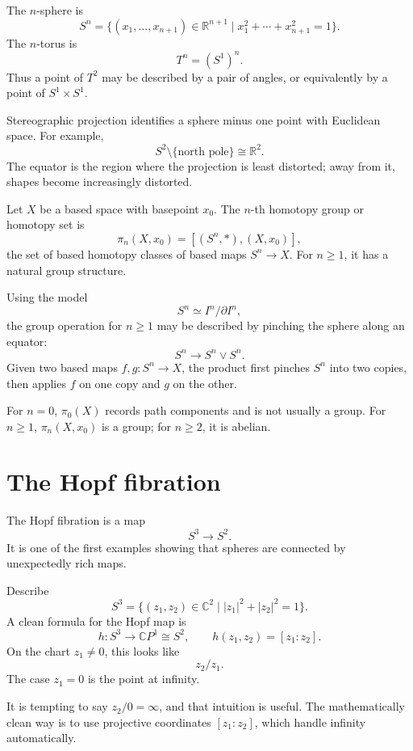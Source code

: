 The \(n\)-sphere is
\[
  S^n=\{(x_1,\dots,x_{n+1})\in\mathbb R^{n+1}\mid x_1^2+\cdots+x_{n+1}^2=1\}.
\]
The \(n\)-torus is
\[
  T^n=(S^1)^n.
\]
Thus a point of \(T^2\) may be described by a pair of angles, or equivalently by a point of \(S^1\times S^1\).

Stereographic projection identifies a sphere minus one point with Euclidean space.  For example,
\[
  S^2\setminus\{\text{north pole}\}\cong\mathbb R^2.
\]
The equator is the region where the projection is least distorted; away from it, shapes become increasingly distorted.

\begin{definition}
Let \(X\) be a based space with basepoint \(x_0\).  The \(n\)-th homotopy group or homotopy set is
\[
  \pi_n(X,x_0)=[(S^n,*),(X,x_0)],
\]
the set of based homotopy classes of based maps \(S^n\to X\).  For \(n\ge1\), it has a natural group structure.
\end{definition}

Using the model
\[
  S^n\simeq I^n/\partial I^n,
\]
the group operation for \(n\ge1\) may be described by pinching the sphere along an equator:
\[
  S^n\to S^n\vee S^n.
\]
Given two based maps \(f,g:S^n\to X\), the product first pinches \(S^n\) into two copies, then applies \(f\) on one copy and \(g\) on the other.

\begin{remark}
For \(n=0\), \(\pi_0(X)\) records path components and is not usually a group.  For \(n\ge1\), \(\pi_n(X,x_0)\) is a group; for \(n\ge2\), it is abelian.
\end{remark}

\section{The Hopf fibration}

The Hopf fibration is a map
\[
  S^3\to S^2.
\]
It is one of the first examples showing that spheres are connected by unexpectedly rich maps.

Describe
\[
  S^3=\{(z_1,z_2)\in\mathbb C^2\mid |z_1|^2+|z_2|^2=1\}.
\]
A clean formula for the Hopf map is
\[
  h:S^3\to\mathbb CP^1\cong S^2,\qquad h(z_1,z_2)=[z_1:z_2].
\]
On the chart \(z_1\neq0\), this looks like
\[
  z_2/z_1.
\]
The case \(z_1=0\) is the point at infinity.

\begin{caution}
It is tempting to say \(z_2/0=\infty\), and that intuition is useful.  The mathematically clean way is to use projective coordinates \([z_1:z_2]\), which handle infinity automatically.
\end{caution}

